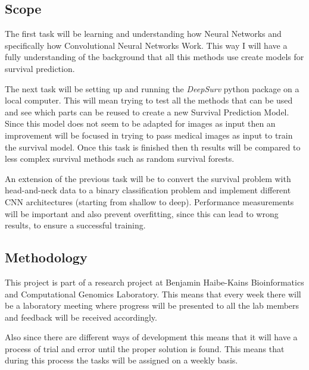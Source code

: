 \subsection{Scope}

The first task will be learning and understanding how Neural Networks and specifically how 
Convolutional Neural Networks Work. This way I will have a fully understanding of the background
that all this methods use create models for survival prediction.

The next task will be setting up and running the \emph{DeepSurv} python package on a local computer.
This will mean trying to test all the methods that can be used and see which parts can be reused 
to create a new Survival Prediction Model. Since this model does not seem to be adapted for images
as input then an improvement will be focused in trying to pass medical images as input to train
the survival model. Once this task is finished then th results will be compared to less complex
survival methods such as random survival forests.

An extension of the previous task will be to convert the survival problem with head-and-neck data
to a binary classification problem and implement different CNN architectures (starting from 
shallow to deep). Performance measurements will be important and also prevent overfitting, since 
this can lead to wrong results, to ensure a successful training.

\subsection{Methodology}

This project is part of a research project at Benjamin Haibe-Kains Bioinformatics and 
Computational Genomics Laboratory. This means that every week there will be a laboratory meeting
where progress will be presented to all the lab members and feedback will be received accordingly. 

Also since there are different ways of development this means that it will have a process of trial
and error until the proper solution is found. This means that during this process the
tasks will be assigned on a weekly basis.
